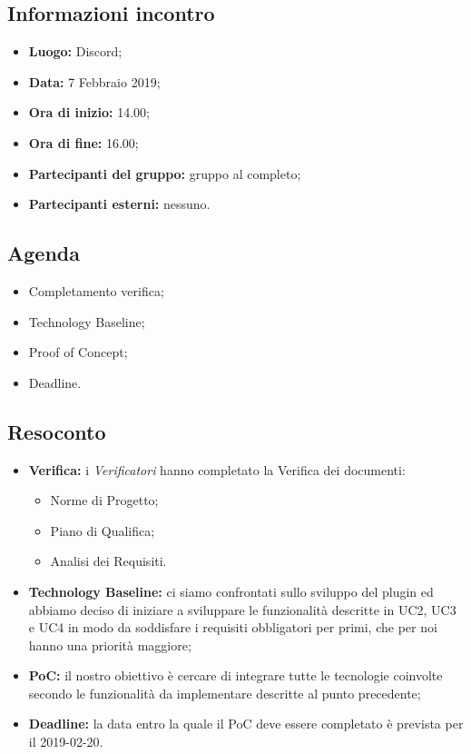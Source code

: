 \subsection{Informazioni incontro}
\begin{itemize}
	\item { \textbf{Luogo:} Discord};
	\item { \textbf{Data:} 7 Febbraio 2019};
	\item { \textbf{Ora di inizio:} 14.00};
	\item { \textbf{Ora di fine:} 16.00};
	\item { \textbf{Partecipanti del gruppo:} gruppo al completo};
	\item { \textbf{Partecipanti esterni:} nessuno}.
\end{itemize}


\subsection{Agenda}
\begin{itemize}
	\item {Completamento verifica;}
	\item {Technology Baseline;}
	\item {Proof of Concept;}
	\item {Deadline.}
\end{itemize}

\subsection{Resoconto}
\begin{itemize}
	\item { \textbf{Verifica:} i \emph{Verificatori} hanno completato la Verifica dei documenti:
	\begin{itemize}
		\item Norme di Progetto;
		\item Piano di Qualifica;
		\item Analisi dei Requisiti.
	\end{itemize}}
	\item { \textbf{Technology Baseline:} ci siamo confrontati sullo sviluppo del plugin ed abbiamo deciso di iniziare a sviluppare le funzionalità descritte in UC2, UC3 e UC4 in modo da soddisfare i requisiti obbligatori per primi, che per noi hanno una priorità maggiore;}
	\item { \textbf{PoC:} il nostro obiettivo è cercare di integrare tutte le tecnologie coinvolte secondo le funzionalità da implementare descritte al punto precedente;}	
	\item { \textbf{Deadline:} la data entro la quale il PoC deve essere completato è prevista per il 2019-02-20.}
\end{itemize}

